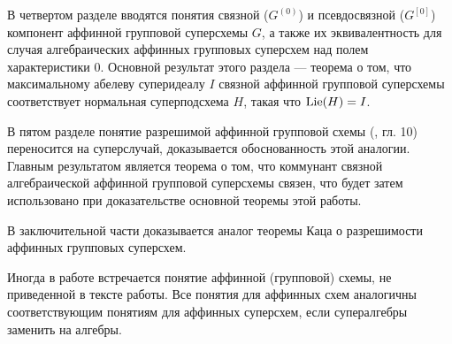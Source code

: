 В четвертом разделе вводятся понятия связной ($ G^{(0)}$) и псевдосвязной ($ G^{[0]}$)
компонент аффинной групповой суперсхемы $ G $, а также их эквивалентность
для случая алгебраических аффинных групповых суперсхем над полем характеристики 0.
Основной результат этого раздела --- теорема о том, что максимальному
абелеву суперидеалу $ I $ связной аффинной групповой суперсхемы соответствует
нормальная суперподсхема $ H $, такая что $ \mathrm{Lie}(H) = I $.

В пятом разделе понятие разрешимой аффинной групповой схемы
(\cite{waterhouse}, гл. 10) переносится на суперслучай, доказывается
обоснованность этой аналогии. Главным результатом является теорема о том, что
коммунант связной алгебраической аффинной групповой суперсхемы связен,
что будет затем использовано при доказательстве основной теоремы этой работы.

В заключительной части доказывается аналог теоремы Каца о разрешимости
аффинных групповых суперсхем.

Иногда в работе встречается понятие аффинной (групповой) схемы, не приведенной
в тексте работы. Все понятия для аффинных схем аналогичны соответствующим
понятиям для аффинных суперсхем, если супералгебры заменить на алгебры.